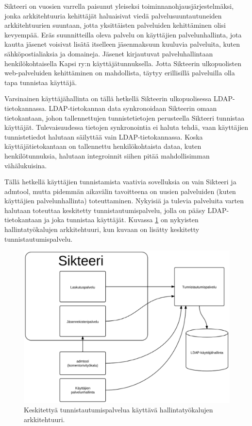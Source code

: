 Sikteeri on vuosien varrella paisunut yleiseksi toiminnanohjausjärjestelmäksi, jonka arkkitehtuuria kehittäjät haluaisivat viedä palvelusuuntautuneiden arkkitehtuurien suuntaan, jotta yksittäisten palveluiden kehittäminen olisi kevyempää. Eräs suunnitteilla oleva palvelu on käyttäjien palvelunhallinta, jota kautta jäsenet voisivat lisätä itselleen jäsenmaksuun kuuluvia palveluita, kuten sähköpostialiaksia ja domaineja. Jäsenet kirjautuvat palveluhallintaan henkilökohtaisella Kapsi ry:n käyttäjätunnuksella. Jotta Sikteerin ulkopuolisten web-palveluiden kehittäminen on mahdollista, täytyy erillisillä palveluilla olla tapa tunnistaa käyttäjä.

Varsinainen käyttäjähallinta on tällä hetkellä Sikteerin ulkopuolisessa LDAP-tie\-to\-kan\-nas\-sa. LDAP-tietokannan data synkronoidaan Sikteerin omaan tietokantaan, johon tallennettujen tunnistetietojen perusteella Sikteeri tunnistaa käyttäjät. Tulevaisuudessa tietojen synkronointia ei haluta tehdä, vaan käyttäjien tunnistetiedot halutaan säilyttää vain LDAP-tietokannassa. Koska käyttäjätietokantaan on tallennettu henkilökohtaista dataa, kuten henkilötunnuksia, halutaan integroinnit siihen pitää mahdollisimman vähälukuisina.

Tällä hetkellä käyttäjien tunnistamista vaativia sovelluksia on vain Sikteeri ja admtool, mutta pidemmän aikavälin tavoitteena on uusien palveluiden (kuten käyttäjien palvelunhallinta) toteuttaminen. Nykyisiä ja tulevia palveluita varten halutaan toteuttaa keskitetty tunnistautumispalvelu, jolla on pääsy LDAP-tietokantaan ja joka tunnistaa käyttäjät. Kuvassa \ref{kapsi_nykyinen_uusi} on nykyisten hallintatyökalujen arkkitehtuuri, kun kuvaan on lisätty keskitetty tunnistautumispalvelu.

\begin{figure}[ht]
\centering
\includegraphics[width=.7\textwidth]{toteutus/kapsi_uusi.eps}
\caption{Keskitettyä tunnistautumispalvelua käyttävä hallintatyökalujen arkkitehtuuri.}%
\label{kapsi_nykyinen_uusi}
\end{figure}

